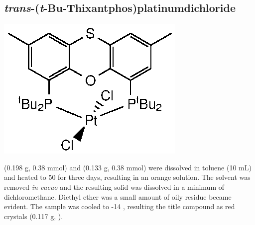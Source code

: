 
\subsection*{\emph{trans}-(\emph{t}-Bu-Thixantphos)platinumdichloride}
\begin{structure}[h]
\begin{center}
\includegraphics{../Structures/StBuPtCl2.eps}
\end{center}
\end{structure}

\tBuThixantphos (0.198 g, 0.38 mmol) and \ce{[Pt(hex)Cl2]} (0.133 g, 0.38 mmol) were dissolved in toluene (10 mL) and heated to 50 \degC for three days, resulting in an orange solution.  The solvent was removed \emph{in vacuo} and the resulting solid was dissolved in a minimum of dichloromethane.  Diethyl ether was a small amount of oily residue became evident.  The sample was cooled to -14 \degC, resulting the title compound as red crystals (0.117 g, \fixme{\%}).

